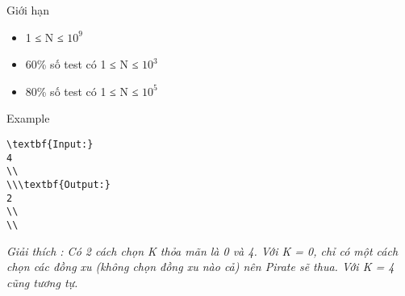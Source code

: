 Giới hạn
\begin{itemize}
	\item     1 ≤ N ≤ $10^{9}$
	\item     60\% số test có 1 ≤ N ≤ $10^{3}$
	\item     80\% số test có 1 ≤ N ≤ $10^{5}$
\end{itemize}
Example
\begin{verbatim}
\textbf{Input:}
4
\\
\\\textbf{Output:}
2
\\
\\\end{verbatim}

\emph{     Giải thích        : Có 2 cách chọn K thỏa mãn là 0 và 4. Với K = 0, chỉ có một cách chọn các đồng xu (không chọn đồng xu nào cả) nên Pirate sẽ thua. Với K = 4 cũng tương tự.    
\\}